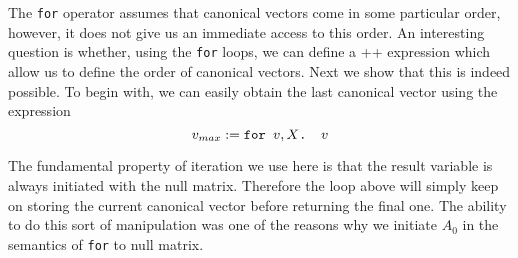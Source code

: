 

\medskip

 The \texttt{for} operator assumes that canonical vectors come in some particular order, however, it does not give us an immediate access to this order. An interesting question is whether, using the \texttt{for} loops, we can define a \lang++ expression which allow us to define the order of canonical vectors. Next we show that this is indeed possible. To begin with, we can easily obtain the last canonical vector using the expression $$v_{max} := \texttt{for }v,X \texttt{. }v$$

The fundamental property of iteration we use here is that the result variable is always initiated with the null matrix. Therefore the loop above will simply keep on storing the current canonical vector before returning the final one. The ability to do this sort of manipulation was one of the reasons why we initiate $A_0$ in the semantics of \texttt{for} to null matrix.

